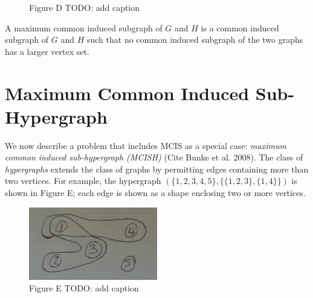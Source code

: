 \begin{figure}[h!]
\centering
{}
\qquad
{}
\caption{Figure D TODO: add caption}
\end{figure}

A maximum common induced subgraph of $G$ and $H$ is a common induced subgraph of $G$
and $H$ such that no common induced subgraph of the two graphs has a larger
vertex set.

\section{Maximum Common Induced Sub-Hypergraph}

We now describe a problem that includes MCIS as a special case: \emph{maximum common
induced sub-hypergraph (MCISH)} (Cite Bunke et al. 2008). The class of
\emph{hypergraphs} extends the class of graphs by permitting edges containing more
than two vertices. For example, the hypergraph $(\{1,2,3,4,5\}, \{\{1,2,3\}, \{1,4\}\})$
is shown in Figure E; each edge is shown as a shape enclosing two or more
vertices.

\begin{figure}[h!]
\centering
\includegraphics[width=0.5\textwidth]{10-introduction/img/figureE}
\caption{Figure E TODO: add caption}
\end{figure}

